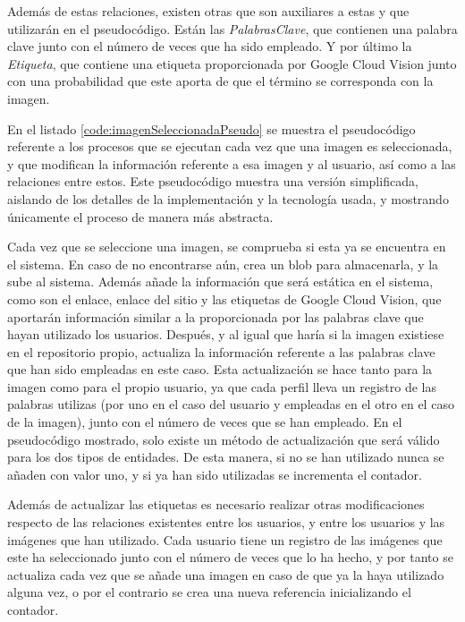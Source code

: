 Además de estas relaciones, existen otras que son auxiliares a estas y que utilizarán en el pseudocódigo. Están las \textit{PalabrasClave}, que contienen una palabra clave junto con el número de veces que ha sido empleado. Y por último la \textit{Etiqueta}, que contiene una etiqueta proporcionada por Google Cloud Vision junto con una probabilidad que este aporta de que el término se corresponda con la imagen. 

En el listado \ref{code:imagenSeleccionadaPseudo} se muestra el pseudocódigo referente a los procesos que se ejecutan cada vez que una imagen es seleccionada, y que modifican la información referente a esa imagen y al usuario, así como a las relaciones entre estos. Este pseudocódigo muestra una versión simplificada, aislando de los detalles de la implementación y la tecnología usada, y mostrando únicamente el proceso de manera más abstracta.

Cada vez que se seleccione una imagen, se comprueba si esta ya se encuentra en el sistema. En caso de no encontrarse aún, crea un blob para almacenarla, y la sube al sistema. Además añade la información que será estática en el sistema, como son el enlace, enlace del sitio y las etiquetas de Google Cloud Vision, que aportarán información similar a la proporcionada por las palabras clave que hayan utilizado los usuarios. Después, y al igual que haría si la imagen existiese en el repositorio propio, actualiza la información referente a las palabras clave que han sido empleadas en este caso. Esta actualización se hace tanto para la imagen como para el propio usuario, ya que cada perfil lleva un registro de las palabras utilizas (por uno en el caso del usuario y empleadas en el otro en el caso de la imagen), junto con el número de veces que se han empleado. En el pseudocódigo mostrado, solo existe un método de actualización que será válido para los dos tipos de entidades. De esta manera, si no se han utilizado nunca se añaden con valor uno, y si ya han sido utilizadas se incrementa el contador.

Además de actualizar las etiquetas es necesario realizar otras modificaciones respecto de las relaciones existentes entre los usuarios, y entre los usuarios y las imágenes que han utilizado. Cada usuario tiene un registro de las imágenes que este ha seleccionado junto con el número de veces que lo ha hecho, y por tanto se actualiza cada vez que se añade una imagen en caso de que ya la haya utilizado alguna vez, o por el contrario se crea una nueva referencia inicializando el contador.


